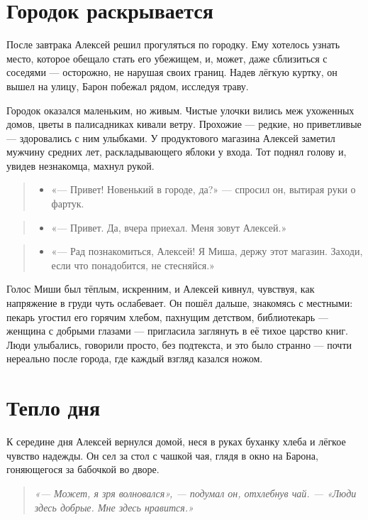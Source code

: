 \documentclass[12pt,a4paper]{book}
\newenvironment{dialogue}{\begin{quote}\itshape\begin{itemize}\item[]}{\end{itemize}\end{quote}}
\newenvironment{innerthought}{\begin{quote}\small\itshape}{\end{quote}}
\begin{document}
\section{Городок раскрывается}

После завтрака Алексей решил прогуляться по городку. Ему хотелось узнать место, которое обещало стать его убежищем, и, может, даже сблизиться с соседями — осторожно, не нарушая своих границ. Надев лёгкую куртку, он вышел на улицу, Барон побежал рядом, исследуя траву.

Городок оказался маленьким, но живым. Чистые улочки вились меж ухоженных домов, цветы в палисадниках кивали ветру. Прохожие — редкие, но приветливые — здоровались с ним улыбками. У продуктового магазина Алексей заметил мужчину средних лет, раскладывающего яблоки у входа. Тот поднял голову и, увидев незнакомца, махнул рукой.

\begin{dialogue}
«— Привет! Новенький в городе, да?» — спросил он, вытирая руки о фартук.
\end{dialogue}

\begin{dialogue}
«— Привет. Да, вчера приехал. Меня зовут Алексей.»
\end{dialogue}

\begin{dialogue}
«— Рад познакомиться, Алексей! Я Миша, держу этот магазин. Заходи, если что понадобится, не стесняйся.»
\end{dialogue}

Голос Миши был тёплым, искренним, и Алексей кивнул, чувствуя, как напряжение в груди чуть ослабевает. Он пошёл дальше, знакомясь с местными: пекарь угостил его горячим хлебом, пахнущим детством, библиотекарь — женщина с добрыми глазами — пригласила заглянуть в её тихое царство книг. Люди улыбались, говорили просто, без подтекста, и это было странно — почти нереально после города, где каждый взгляд казался ножом.

\section{Тепло дня}

К середине дня Алексей вернулся домой, неся в руках буханку хлеба и лёгкое чувство надежды. Он сел за стол с чашкой чая, глядя в окно на Барона, гоняющегося за бабочкой во дворе. 

\begin{innerthought}
«— Может, я зря волновался», — подумал он, отхлебнув чай. — «Люди здесь добрые. Мне здесь нравится.»
\end{innerthought}
\end{document}
